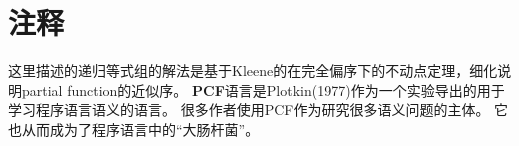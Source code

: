 \section{注释}

这里描述的递归等式组的解法是基于Kleene的在完全偏序下的不动点定理，细化说明\gls{partial function}的近似序。
\textbf{PCF}语言是Plotkin(1977)作为一个实验导出的用于学习程序语言语义的语言。
很多作者使用PCF作为研究很多语义问题的主体。
它也从而成为了程序语言中的“大肠杆菌”。